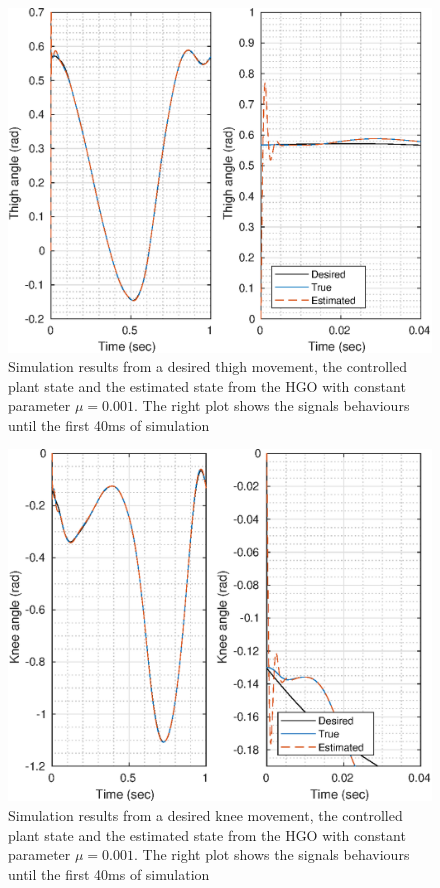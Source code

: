 \documentclass[letterpaper, 10 pt, journal, twocolumn]{IEEEtran}  %
\theoremstyle{plain}
\theoremstyle{definition}
\theoremstyle{remark}
\begin{document}
\begin{figure}[h!]
	\begin{center}
	\includegraphics[width = 13cm]{Figs/q_thigh_mu_1e-03.eps}
	\caption{ Simulation results from a desired thigh movement, the controlled plant state and the estimated state from the HGO with constant parameter $\mu=0.001$. The right plot shows the signals behaviours until the first 40ms of simulation}
	\label{fig:thigh}
	\end{center}
\end{figure}
%
%
\begin{figure}[h!]
	\begin{center}
	\includegraphics[width = 13cm]{Figs/q_knee_mu_1e-03.eps}
	\caption{ Simulation results from a desired knee movement, the controlled plant state and the estimated state from the HGO with constant parameter $\mu=0.001$. The right plot shows the signals behaviours until the first 40ms of simulation}
	\label{fig:knee}
	\end{center}
\end{figure}
\end{document}
